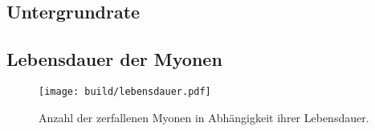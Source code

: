 \subsection{Untergrundrate}


\subsection{Lebensdauer der Myonen}

\begin{figure}
    \centering
    \texttt{[image: build/lebensdauer.pdf]}
    \caption{Anzahl der zerfallenen Myonen in Abhängigkeit ihrer Lebensdauer.}
    \label{fig:leben}
\end{figure}

%

